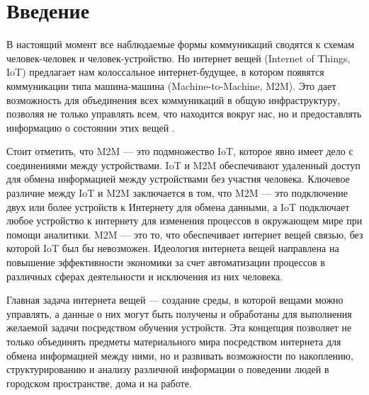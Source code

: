 \section*{Введение}

В настоящий момент все наблюдаемые формы коммуникаций сводятся к схемам человек-человек и человек-устройство. Но интернет вещей (Internet of Things, IoT) предлагает нам колоссальное интернет-будущее, в котором появятся коммуникации типа машина-машина (Machine-to-Machine, M2M). Это дает возможность для объединения всех коммуникаций в общую инфраструктуру, позволяя не только управлять всем, что находится вокруг нас, но и предоставлять информацию о состоянии этих вещей \cite{Dovgal}.

Стоит отметить, что M2M --- это подмножество IoT, которое явно имеет дело с соединениями между устройствами. IoT и M2M обеспечивают удаленный доступ для обмена информацией между устройствами без участия человека. Ключевое различие между IoT и M2M заключается в том, что M2M — это подключение двух или более устройств к Интернету для обмена данными, а IoT подключает любое устройство к интернету для изменения процессов в окружающем мире при помощи аналитики. M2M --- это то, что обеспечивает интернет вещей связью, без которой IoT был бы невозможен. Идеология интернета вещей направлена на повышение эффективности экономики за счет автоматизации процессов в различных сферах деятельности и исключения из них человека.







Главная задача интернета вещей \cite{Markeeva} --- создание среды, в которой вещами можно управлять, а данные о них могут быть получены и обработаны для выполнения желаемой задачи посредством обучения устройств. Эта концепция позволяет не только объединять предметы материального мира посредством интернета для обмена информацией между ними, но и развивать возможности по накоплению, структурированию и анализу различной информации о поведении людей в городском пространстве, дома и на работе.

